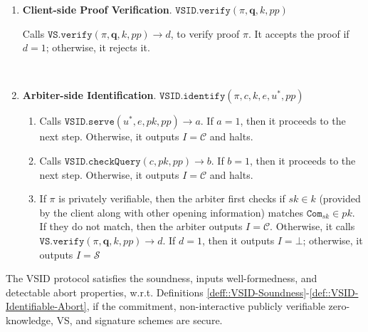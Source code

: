 \begin{enumerate}
\

\item\textbf{Client-side Proof Verification}. $\mathtt{VSID.verify}(\pi,\bm{q},k,{pp})$

Calls $\mathtt{VS.verify}(\pi,\bm{q},k,{pp})\rightarrow d$, to verify  proof $\pi$. It accepts the proof if $d=1$; otherwise, it rejects it. 



\

\item\textbf{Arbiter-side Identification}. $\mathtt{VSID.identify}(\pi,c,k,e,u^{\scriptscriptstyle *},{pp})$ 
\begin{enumerate}


\item\label{Arb-VSID.serve} Calls $\mathtt{VSID.serve}(u^{\scriptscriptstyle *},e,pk,{pp})\rightarrow a$. If $a=1$, then it proceeds to the next step. Otherwise, it outputs $I=\mathcal C$ and halts. 

\item Calls $\mathtt{VSID.checkQuery}(c, pk,{pp})\rightarrow b$. If $b=1$, then it proceeds to the next step. Otherwise, it outputs $I=\mathcal C$ and halts. 

\item  If $\pi$ is  privately verifiable, then the arbiter  first checks if $sk\in k$ (provided by the client along with other opening information) matches $\mathtt{Com}_{\scriptscriptstyle sk}\in pk$. If they do not match, then the arbiter outputs $I=\mathcal C$. Otherwise,  it calls $\mathtt{VS.verify}(\pi, \bm{q},k,{pp})\rightarrow d$. If $d=1$, then it outputs $I=\bot$; otherwise, it outputs $I=\mathcal S$
\end{enumerate}
\end{enumerate}




\begin{theorem}
The VSID protocol satisfies the soundness, inputs well-formedness, and detectable abort properties, w.r.t. Definitions \ref{deff::VSID-Soundness}-\ref{def::VSID-Identifiable-Abort}, if the commitment, non-interactive publicly verifiable zero-knowledge, VS, and signature schemes are secure. 
\end{theorem}

